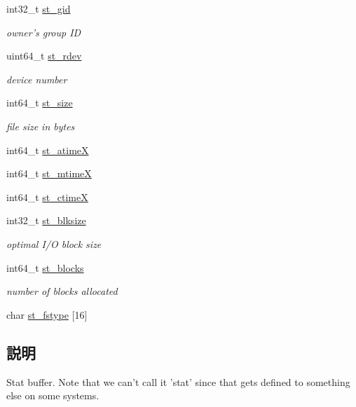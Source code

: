 \begin{DoxyCompactItemize}
int32\_\-t \hyperlink{structSolaris_1_1tgt__stat_a520e7941817660848df8c562c9789145}{st\_\-gid}
\begin{DoxyCompactList}\small\item\em owner's group ID \item\end{DoxyCompactList}\item 
uint64\_\-t \hyperlink{structSolaris_1_1tgt__stat_ac430407fd3b0e421da1ee8f66c95a786}{st\_\-rdev}
\begin{DoxyCompactList}\small\item\em device number \item\end{DoxyCompactList}\item 
int64\_\-t \hyperlink{structSolaris_1_1tgt__stat_aec608d79c93ed6d010aec9f7487e0064}{st\_\-size}
\begin{DoxyCompactList}\small\item\em file size in bytes \item\end{DoxyCompactList}\item 
int64\_\-t \hyperlink{structSolaris_1_1tgt__stat_aa19619629e025e0df8313d1ea279b50b}{st\_\-atimeX}
\item 
int64\_\-t \hyperlink{structSolaris_1_1tgt__stat_a85f7ee07d7d01bcbae6a22cc45f01846}{st\_\-mtimeX}
\item 
int64\_\-t \hyperlink{structSolaris_1_1tgt__stat_a30ae5d81c1593c9a028b0d57d39a6bb7}{st\_\-ctimeX}
\item 
int32\_\-t \hyperlink{structSolaris_1_1tgt__stat_a10c65d9bc94bb57004da3be985b096a2}{st\_\-blksize}
\begin{DoxyCompactList}\small\item\em optimal I/O block size \item\end{DoxyCompactList}\item 
int64\_\-t \hyperlink{structSolaris_1_1tgt__stat_a9817804f8469f6e886f9b29be9cf9d94}{st\_\-blocks}
\begin{DoxyCompactList}\small\item\em number of blocks allocated \item\end{DoxyCompactList}\item 
char \hyperlink{structSolaris_1_1tgt__stat_a1619ec56c3d07bd0d9d35e1473653a63}{st\_\-fstype} \mbox{[}16\mbox{]}
\end{DoxyCompactItemize}


\subsection{説明}
Stat buffer. Note that we can't call it 'stat' since that gets defined to something else on some systems. 

